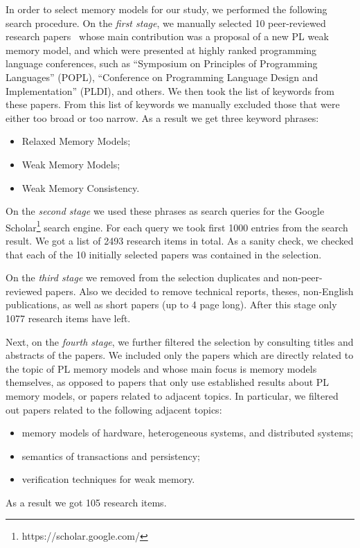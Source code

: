 In order to select memory models for our study, 
we performed the following search procedure.
On the \emph{first stage}, we manually selected 10  
peer-reviewed research papers~\cite{
Manson-al:POPL05,
Batty-al:POPL11,
Lahav-al:PLDI17,
Dolan-al:PLDI18,
Watt-al:PLDI2020,
Jeffrey-Riely:LICS16,
PichonPharabod-Sewell:POPL16,
Kang-al:POPL17,
Chakraborty-Vafeiadis:POPL19,
Paviotti-al:ESOP20
}
whose main contribution was a proposal of a new PL weak memory model, 
and which were presented at highly ranked programming language conferences, 
such as ``Symposium on Principles of Programming Languages'' (POPL),
``Conference on Programming Language Design and Implementation'' (PLDI), and others.
We then took the list of keywords from these papers. 
From this list of keywords we manually excluded those 
that were either too broad or too narrow.
As a result we get three keyword phrases:
\begin{itemize}
  \item Relaxed Memory Models;
  \item Weak Memory Models;
  \item Weak Memory Consistency.
\end{itemize}
 
On the \emph{second stage} we used these phrases as search queries
for the Google Scholar\footnote{https://scholar.google.com/} search engine.
For each query we took first 1000 entries from the search result.
We got a list of 2493 research items in total. 
As a sanity check, we checked that each of the 10 initially 
selected papers was contained in the selection. 

On the \emph{third stage} we removed from the selection duplicates
and non-peer-reviewed papers. 
Also we decided to remove technical reports, theses, 
non-English publications, as well as short papers (up to 4 page long).
After this stage only 1077 research items have left.

Next, on the \emph{fourth stage}, we further filtered the selection 
by consulting titles and abstracts of the papers. 
We included only the papers which are directly related to the 
topic of PL memory models and whose main focus is memory models themselves,
as opposed to papers that only use established results about PL memory models,
or papers related to adjacent topics. 
In particular, we filtered out papers related to the following adjacent topics:
\begin{itemize}
  \item memory models of hardware, heterogeneous systems, and distributed systems;
  \item semantics of transactions and persistency;
  \item verification techniques for weak memory.
\end{itemize}
As a result we got 105 research items.

